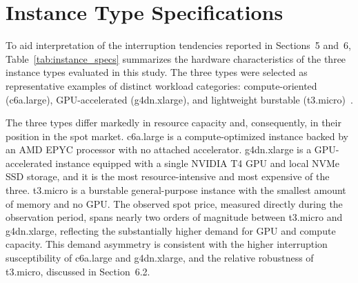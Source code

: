 \documentclass[runningheads]{llncs}
\begin{document}

\appendix

\section{Instance Type Specifications}
\label{app:instance_types}

To aid interpretation of the interruption tendencies reported in Sections~5 and~6, Table~\ref{tab:instance_specs} summarizes the hardware characteristics of the three instance types evaluated in this study. The three types were selected as representative examples of distinct workload categories: compute-oriented (c6a.large), GPU-accelerated (g4dn.xlarge), and lightweight burstable (t3.micro)~\cite{Pham2018,AWSInstanceTypes}.

The three types differ markedly in resource capacity and, consequently, in their position in the spot market. c6a.large is a compute-optimized instance backed by an AMD EPYC processor with no attached accelerator. g4dn.xlarge is a GPU-accelerated instance equipped with a single NVIDIA T4 GPU and local NVMe SSD storage, and it is the most resource-intensive and most expensive of the three. t3.micro is a burstable general-purpose instance with the smallest amount of memory and no GPU. The observed spot price, measured directly during the observation period, spans nearly two orders of magnitude between t3.micro and g4dn.xlarge, reflecting the substantially higher demand for GPU and compute capacity. This demand asymmetry is consistent with the higher interruption susceptibility of c6a.large and g4dn.xlarge, and the relative robustness of t3.micro, discussed in Section~6.2.
\end{document}
